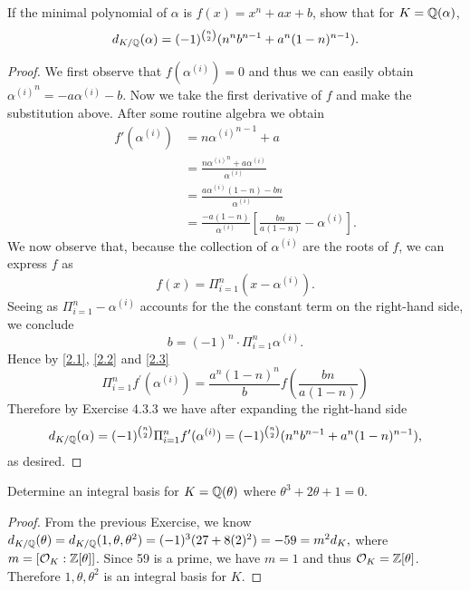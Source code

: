 \documentclass[10pt]{amsart}
\begin{document}
\begin{thm}
  \newcommand{\AL}{{\alpha^{(i)}}}
  \label{Ex2}
  If the minimal polynomial of $\alpha$ is $f(x) = x^n + ax +b$, show that for $K = \mathbb{Q}(\alpha)$, 
  $$d_{K/\mathbb{Q}}(\alpha) = (-1)^{n \choose 2}(n^nb^{n-1} + a^n(1-n)^{n-1}).$$
  \begin{proof}
    We first observe that $f(\AL) = 0$ and thus we can easily obtain $\AL^{n} = -a\AL -b$.
    Now we take the first derivative of $f$ and make the substitution above.  
    After some routine algebra we obtain
    \begin{equation}
      \begin{split}
        \label{2.1}
        f'(\alpha^{(i)}) &= n\AL^{n-1} + a\\
        &= \frac{n\AL^{n} + a\AL}{\AL}\\
        &= \frac{a\AL(1-n) - bn}{\AL}\\
        &= \frac{-a(1-n)}{\AL}\left[\frac{bn}{a(1-n)} - \AL \right].
      \end{split}
    \end{equation}
    We now observe that, because the collection of $\AL$ are the roots of $f$, we can express $f$ as 
    \begin{equation}
      \label{2.2}
      f(x) = \Pi_{i=1}^n (x - \AL).
    \end{equation}
    Seeing as $\Pi_{i=1}^n -\AL$ accounts for the the constant term on the right-hand side, we conclude 
    \begin{equation}
      \label{2.3}
      b = (-1)^n\cdot \Pi_{i=1}^n \AL.
    \end{equation}
    Hence by \eqref{2.1}, \eqref{2.2} and \eqref{2.3} $$\Pi_{i=1}^{n}f^{\prime}(\alpha^{(i)}) = \frac{a^n(1-n)^n}{b}f\left(\frac{bn}{a(1-n)}\right)$$
    Therefore by Exercise 4.3.3 we have after expanding the right-hand side
    $$d_{K/\mathbb{Q}}(\alpha) = (-1)^{n \choose 2}\Pi_{i=1}^{n}f^{\prime}(\alpha^{(i)}) = (-1)^{n \choose 2}(n^nb^{n-1} + a^n(1-n)^{n-1}),$$
    as desired.
  \end{proof}
\end{thm}

\begin{thm}
  \label{Ex3}
  Determine an integral basis for $K = \mathbb{Q}(\theta)$ where $\theta^3 + 2\theta + 1 = 0$.
  \begin{proof}
    From the previous Exercise, we know $d_{K/\mathbb{Q}}(\theta) = d_{K/\mathbb{Q}}(1,\theta,\theta^2) = (-1)^{3}(27 + 8(2)^{2}) = - 59 = m^2d_K,$ where $m = [\mathcal{O}_K : \mathbb{Z}[\theta]]$.
    Since 59 is a prime, we have $m = 1$ and thus $\mathcal{O}_K = \mathbb{Z}[\theta]$.
    Therefore $1, \theta, \theta^2$ is an integral basis for $K$.
  \end{proof}
\end{thm}
\end{document}
